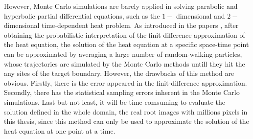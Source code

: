 However, Monte Carlo simulations are barely applied in solving parabolic and hyperbolic partial differential equations, such as the $1-$ dimensional and $2-$ dimensional time-dependent heat problem. As introduced in the papers \cite{sadiku2006monte} \cite{gemjoz2017mcmheat}, after obtaining the probabilistic interpretation of the finit-difference approximation of the heat equation, the solution of the heat equation at a specific space-time point can be approximated by averaging a large number of random-walking particles, whose trajectories are simulated by the Monte Carlo methods untill they hit the any sites of the target boundary. However, the drawbacks of this method are obvious. Firstly, there is the error appeared in the finit-difference approximation. Secondly, there has the statistical sampling errors inherent in the Monte Carlo simulations. Last but not least, it will be time-comsuming to evaluate the solution defined in the whole domain, the real root images with millions pixels in this thesis, since this method can only be used to approximate the solution of the heat equation at one point at a time. 









